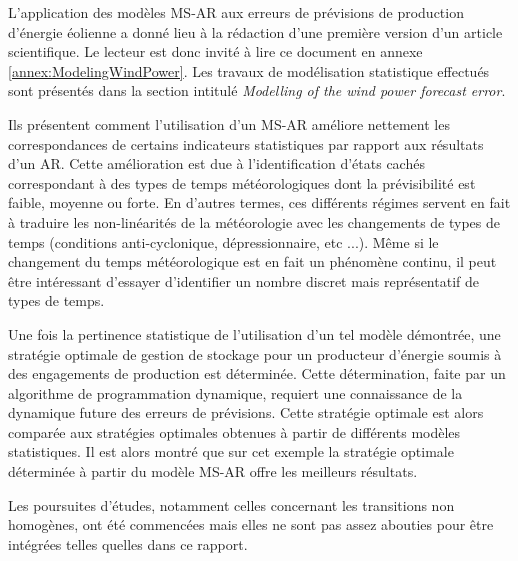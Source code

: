 \documentclass[12pt, french]{report}
\begin{document}
L'application des modèles MS-AR aux erreurs de prévisions de production d'énergie éolienne a donné lieu à la rédaction d'une première version d'un article scientifique. Le lecteur est donc invité à lire ce document en annexe \ref{annex:ModelingWindPower}. Les travaux de modélisation statistique effectués sont présentés dans la section intitulé \textit{Modelling of the wind power forecast error}.

Ils présentent comment l'utilisation d'un MS-AR améliore nettement les correspondances de certains indicateurs statistiques par rapport aux résultats d'un AR. Cette amélioration est due à l'identification d'états cachés correspondant à des types de temps météorologiques dont la prévisibilité est faible, moyenne ou forte. En d'autres termes, ces différents régimes servent en fait à traduire les non-linéarités de la météorologie avec les changements de types de temps (conditions anti-cyclonique, dépressionnaire, etc ...). Même si le changement du temps météorologique est en fait un phénomène continu, il peut être intéressant d'essayer d'identifier un nombre discret mais représentatif de types de temps.

Une fois la pertinence statistique de l'utilisation d'un tel modèle démontrée, une stratégie optimale de gestion de stockage pour un producteur d'énergie soumis à des engagements de production est déterminée. Cette détermination, faite par un algorithme de programmation dynamique, requiert une connaissance de la dynamique future des erreurs de prévisions. Cette stratégie optimale est alors comparée aux stratégies optimales obtenues à partir de différents modèles statistiques. Il est alors montré que sur cet exemple la stratégie optimale déterminée à partir du modèle MS-AR offre les meilleurs résultats.

Les poursuites d'études, notamment celles concernant les transitions non homogènes, ont été commencées mais elles ne sont pas assez abouties pour être intégrées telles quelles dans ce rapport.
\end{document}
